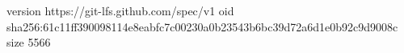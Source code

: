 version https://git-lfs.github.com/spec/v1
oid sha256:61c11ff390098114e8eabfc7c00230a0b23543b6bc39d72a6d1e0b92c9d9008c
size 5566
